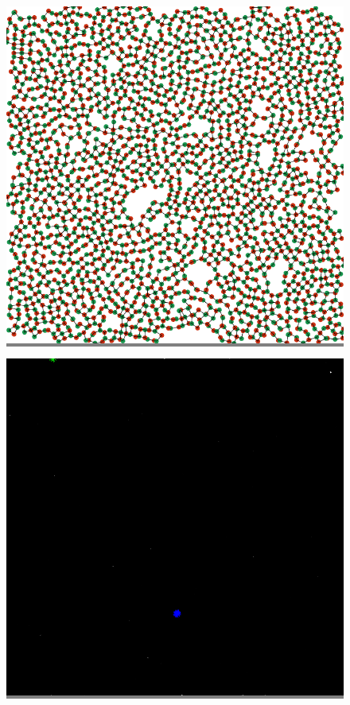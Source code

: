 \documentclass{article}
\begin{document}
\begin{figure}
\begin{minipage}{0.3\textwidth}
    \end{minipage}
    \hspace{\fill}
    \begin{minipage}{0.3\textwidth}
    \colorbox{gray}{\includegraphics[width=\linewidth]{./images/square_4_bb_1.png}}
    \end{minipage}
    \vskip 0.1in
    \begin{minipage}{0.3\textwidth}
    \colorbox{gray}{\includegraphics[width=\linewidth]{./images/square_5.png}}

\end{minipage}
\end{figure}
\end{document}
